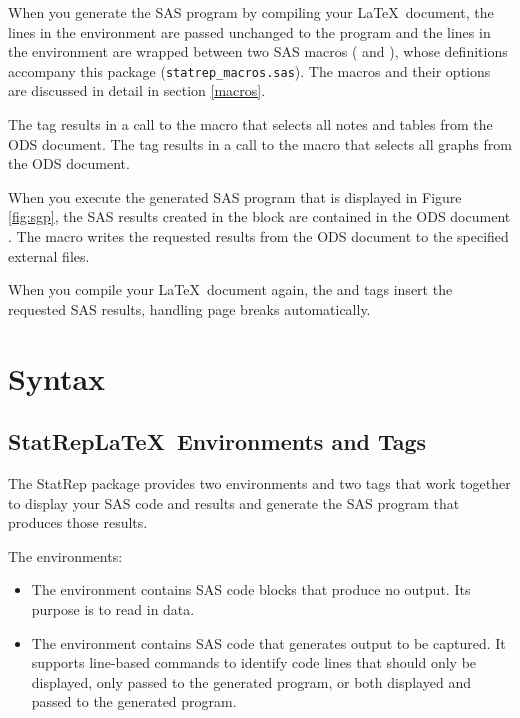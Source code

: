 \documentclass[article,oneside]{memoir}
\newcommand*{\StatRep}{\textsf{StatRep}\xspace}
\begin{document}
  When you generate the SAS program by compiling your \LaTeX\ document,
  the lines in the  environment are passed unchanged to the program
  and
  the lines in the 
  environment are wrapped between two SAS macros ( and ),
  whose definitions accompany this package (\texttt{statrep\_macros.sas}).
  The macros and their options are discussed in detail in section \ref{macros}.

  The  tag results in a call to the  macro that selects all notes and tables from the ODS document.
  The  tag results in a call to the  macro that selects all graphs from the ODS document.

  When you execute the generated SAS program that is displayed
  in Figure \ref{fig:sgp}, the SAS results created in the  block are contained
  in the ODS document . The  macro writes the requested results from the ODS document
  to the specified
  external files.

  When you compile your \LaTeX\ document again, the  and  tags
  insert the requested SAS results, handling page breaks automatically.

\chapter{Syntax}
\section{\StatRep \LaTeX\ Environments and Tags}
     The \StatRep package provides two environments and two tags that work
     together to display your SAS code and results and generate the SAS program
     that produces those results.

     The environments:
     \begin{itemize}
     \item The  environment contains SAS code blocks that produce no output.
     Its purpose is to read in data.
     \item The  environment contains SAS code that generates output to be
     captured. It supports line-based commands to identify
     code lines that should only be displayed, only passed to the generated program,
     or both displayed and passed to the generated program.
     \end{itemize}
\end{document}

